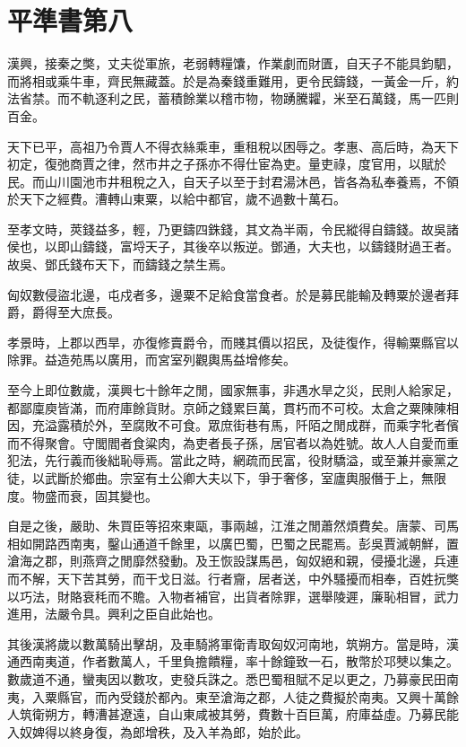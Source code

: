 \chapter{平準書第八}

漢興，接秦之獘，丈夫從軍旅，老弱轉糧馕，作業劇而財匱，自天子不能具鈞駟，而將相或乘牛車，齊民無藏蓋。於是為秦錢重難用，更令民鑄錢，一黃金一斤，約法省禁。而不軌逐利之民，蓄積餘業以稽市物，物踴騰糶，米至石萬錢，馬一匹則百金。

天下已平，高祖乃令賈人不得衣絲乘車，重租稅以困辱之。孝惠、高后時，為天下初定，復弛商賈之律，然市井之子孫亦不得仕宦為吏。量吏祿，度官用，以賦於民。而山川園池市井租稅之入，自天子以至于封君湯沐邑，皆各為私奉養焉，不領於天下之經費。漕轉山東粟，以給中都官，歲不過數十萬石。

至孝文時，莢錢益多，輕，乃更鑄四銖錢，其文為半兩，令民縱得自鑄錢。故吳諸侯也，以即山鑄錢，富埒天子，其後卒以叛逆。鄧通，大夫也，以鑄錢財過王者。故吳、鄧氏錢布天下，而鑄錢之禁生焉。

匈奴數侵盜北邊，屯戍者多，邊粟不足給食當食者。於是募民能輸及轉粟於邊者拜爵，爵得至大庶長。

孝景時，上郡以西旱，亦復修賣爵令，而賤其價以招民，及徒復作，得輸粟縣官以除罪。益造苑馬以廣用，而宮室列觀輿馬益增修矣。

至今上即位數歲，漢興七十餘年之閒，國家無事，非遇水旱之災，民則人給家足，都鄙廩庾皆滿，而府庫餘貨財。京師之錢累巨萬，貫朽而不可校。太倉之粟陳陳相因，充溢露積於外，至腐敗不可食。眾庶街巷有馬，阡陌之閒成群，而乘字牝者儐而不得聚會。守閭閻者食粱肉，為吏者長子孫，居官者以為姓號。故人人自愛而重犯法，先行義而後絀恥辱焉。當此之時，網疏而民富，役財驕溢，或至兼并豪黨之徒，以武斷於鄉曲。宗室有土公卿大夫以下，爭于奢侈，室廬輿服僭于上，無限度。物盛而衰，固其變也。

自是之後，嚴助、朱買臣等招來東甌，事兩越，江淮之閒蕭然煩費矣。唐蒙、司馬相如開路西南夷，鑿山通道千餘里，以廣巴蜀，巴蜀之民罷焉。彭吳賈滅朝鮮，置滄海之郡，則燕齊之閒靡然發動。及王恢設謀馬邑，匈奴絕和親，侵擾北邊，兵連而不解，天下苦其勞，而干戈日滋。行者齎，居者送，中外騷擾而相奉，百姓抏獘以巧法，財賂衰秏而不贍。入物者補官，出貨者除罪，選舉陵遲，廉恥相冒，武力進用，法嚴令具。興利之臣自此始也。

其後漢將歲以數萬騎出擊胡，及車騎將軍衛青取匈奴河南地，筑朔方。當是時，漢通西南夷道，作者數萬人，千里負擔饋糧，率十餘鐘致一石，散幣於邛僰以集之。數歲道不通，蠻夷因以數攻，吏發兵誅之。悉巴蜀租賦不足以更之，乃募豪民田南夷，入粟縣官，而內受錢於都內。東至滄海之郡，人徒之費擬於南夷。又興十萬餘人筑衛朔方，轉漕甚遼遠，自山東咸被其勞，費數十百巨萬，府庫益虛。乃募民能入奴婢得以終身復，為郎增秩，及入羊為郎，始於此。

